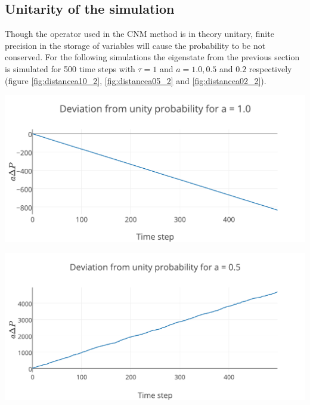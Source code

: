 \subsection*{Unitarity of the simulation}
Though the operator used in the CNM method is in theory unitary, finite precision in the storage of variables will cause the probability to be not conserved. For the following simulations the eigenstate from the previous section is simulated for 500 time steps with $\tau = 1$ and $a = 1.0, 0.5$ and $0.2$ respectively (figure \ref{fig:distancea10_2}, \ref{fig:distancea05_2} and \ref{fig:distancea02_2}).
\begin{Figure}
    \centering
    \includegraphics[width=\linewidth]{norma10.pdf}
    \label{fig:distancea10_2}
\end{Figure}
\begin{Figure}
    \centering
    \includegraphics[width=\linewidth]{norma05.pdf}
    \label{fig:distancea05_2}
\end{Figure}
